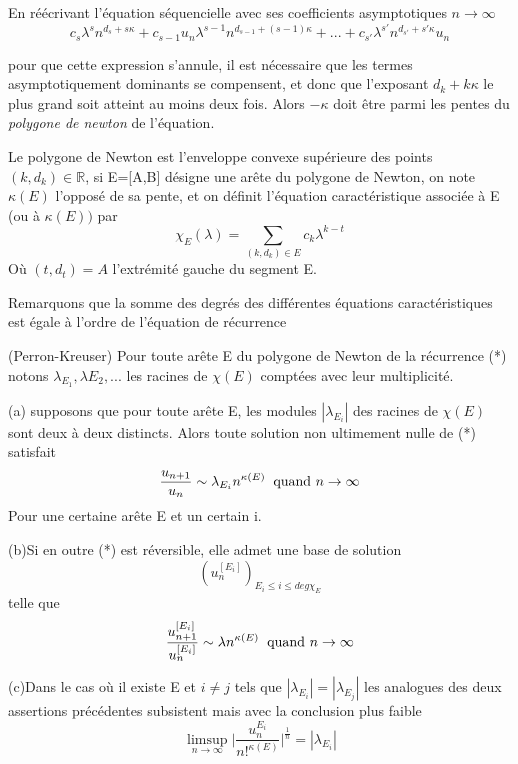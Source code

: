 \documentclass[a4paper,10.5pt]{article}
\begin{document}
	\noindent En réécrivant l'équation séquencielle avec ses coefficients asymptotiques $n \rightarrow \infty$
	\[c_{s}\lambda^{s} n^{d_{s}+s\kappa}+c_{s-1}u_{n}\lambda^{s-1} n^{d_{s-1}+(s-1)\kappa}+...+c_{s'}\lambda^{s'} n^{d_{s'}+s'\kappa}u_{n}\]
	
	pour que cette expression s'annule, il est nécessaire que les termes asymptotiquement dominants se compensent, et donc que l'exposant $d_{k}+k\kappa$ le plus grand soit atteint au moins deux fois. Alors $-\kappa$ doit être parmi les pentes du \textit{polygone de newton} de l'équation.
	
	
	\begin{definition} Le polygone de Newton est l'enveloppe convexe supérieure des points $(k, d_{k}) \in \mathbb{R}$, si E=[A,B] désigne une arête du polygone de Newton, on note $\kappa(E)$ l'opposé de sa pente, et on définit l'équation caractéristique associée à E (ou à $\kappa(E))$ par
		\[\chi_{E}(\lambda)=\sum_{(k,d_{k}) \in E} c_{k}\lambda^{k-t}\]
		Où $(t,d_{t})=A$ l'extrémité gauche du segment E.
	\end{definition}
	
	Remarquons que la somme des degrés des différentes équations caractéristiques est égale à l'ordre de l'équation de récurrence 
	
	\begin{theorem} (Perron-Kreuser)
		Pour toute arête E du polygone de Newton de la récurrence (*) notons $\lambda_{E_{1}},\lambda{E_{2}},...$ les racines de $\chi(E)$ comptées avec leur multiplicité.
		
		(a) supposons que pour toute arête E, les modules $|\lambda_{E_{i}}|$ des racines de $\chi(E)$ sont deux à deux distincts. Alors toute solution non ultimement nulle de (*) satisfait
		\[\frac{u_{n+1}}{u_{n}}\sim \lambda_{E_{i}}n^{\kappa(E)} \hspace{2mm} \text{quand } n \rightarrow \infty\]
		Pour une certaine arête E et un certain i.
		
		(b)Si en outre (*) est réversible, elle admet une base de solution 
		\[(u_{n}^{[E_{i}]})_{E_{i}\leq i \leq deg \chi_{E}}\]
		telle que 
		\[\frac{u_{n+1}^{[E_{i}]}}{u_{n}^{[E_{i}]}}\sim \lambda n^{\kappa(E)} \hspace{2mm} \text{quand } n \rightarrow \infty\]
		
		(c)Dans le cas où il existe E et $i \neq j$ tels que $|\lambda_{E_{i}}|=|\lambda_{E_{j}}|$ les analogues des deux assertions précédentes subsistent mais avec la conclusion plus faible
		\[\limsup_{n \rightarrow \infty } \big|\frac{u_{n}^{E_{i}}}{n!^{\kappa(E)}}\big|^{\frac{1}{n}}=|\lambda_{E_{i}}|\]
	\end{theorem}
	
\end{document}
